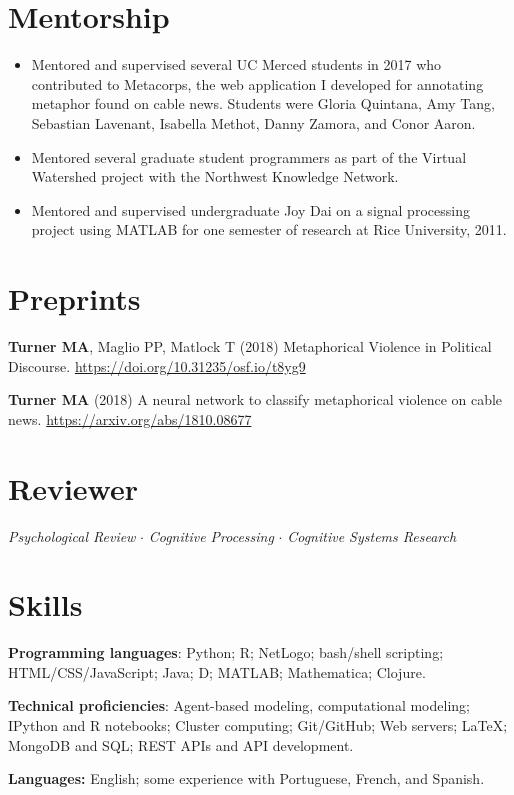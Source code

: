 \documentclass[letterpaper,11pt,oneside]{article}
\begin{document}
\noindent
\section*{\textcolor{gunmetal}{Mentorship}}
\begin{itemize}
  \item Mentored and supervised several UC Merced students in 2017 
    who contributed to
    Metacorps, the web application I developed for annotating metaphor found
    on cable news. Students were Gloria Quintana, Amy Tang, Sebastian Lavenant, Isabella Methot,
    Danny Zamora, and Conor Aaron.
  \item
    Mentored several graduate student programmers as part of the Virtual Watershed
    project with the Northwest Knowledge Network.
  \item Mentored and supervised undergraduate Joy Dai on a signal processing project using MATLAB for
    one semester of research at Rice University, 2011.
\end{itemize}

\noindent
\section*{\textcolor{gunmetal}{Preprints}}
\begin{hangparas}{0.25in}{1}

  \textbf{Turner MA}, Maglio PP, Matlock T (2018) Metaphorical Violence in Political Discourse. \url{https://doi.org/10.31235/osf.io/t8yg9}

  \textbf{Turner MA} (2018) A neural network to classify metaphorical violence on cable news. \url{https://arxiv.org/abs/1810.08677}

\end{hangparas}

\noindent
\section*{\textcolor{gunmetal}{Reviewer}}

  \begin{hangparas}{0.25in}{1}
    \emph{Psychological Review} $\cdot$ \emph{Cognitive Processing} $\cdot$ \emph{Cognitive Systems Research}
  \end{hangparas}


\noindent
\section*{\textcolor{gunmetal}{Skills}}

\begin{hangparas}{0.25in}{1}
  \textbf{Programming languages}: Python; R; NetLogo; bash/shell scripting; 
  HTML/CSS/JavaScript; Java; D; MATLAB; Mathematica; Clojure.

  \textbf{Technical proficiencies}: Agent-based modeling, computational 
  modeling; IPython and R notebooks; Cluster computing;
  Git/GitHub; Web servers; \LaTeX; MongoDB and SQL; REST APIs and API
  development.

  \textbf{Languages:} English; some experience with Portuguese, French,
  and Spanish.
\end{hangparas}
\end{document}
